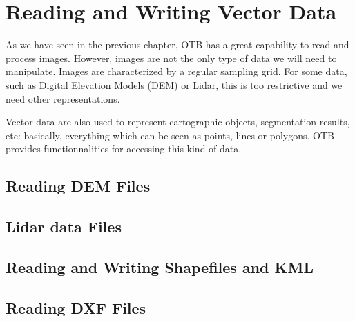 \chapter{Reading and Writing Vector Data}
\label{sec:ReadingVectorData}

As we have seen in the previous chapter, OTB has a great capability to
read and process images. However, images are not the only type of data
we will need to manipulate. Images are characterized by a regular
sampling grid. For some data, such as Digital Elevation Models (DEM)
or Lidar, this is too restrictive and we need other representations.

Vector data are also used to represent cartographic objects,
segmentation results, etc: basically, everything which can be seen as
points, lines or polygons. OTB provides functionnalities for accessing
this kind of data.

\section{Reading DEM Files}
\label{sec:ReadDEM}


\section{Lidar data Files}
\label{sec:ReadLidar}
%
%

\section{Reading and Writing Shapefiles and KML}
\label{sec:ReadVectorData}


\section{Reading DXF Files}
\label{sec:ReadDXF}

